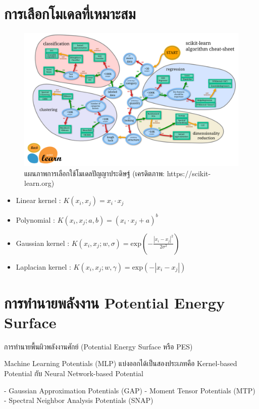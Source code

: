 \section{การเลือกโมเดลที่เหมาะสม}

\begin{figure}[H]
    \centering
    \includegraphics[width=0.9\linewidth]{fig/ml_map.png}
    \caption{แผนภาพการเลือกใช้โมเดลปัญญาประดิษฐ์ (เครดิตภาพ: https://scikit-learn.org)}
    \label{fig:ml_map}
\end{figure}

\begin{itemize}
    \item Linear kernel : $K(x_i, x_j) = x_i \cdot x_j$
    \item Polynomial : $K(x_i, x_j; a, b) = (x_i \cdot x_j + a)^b$
    \item Gaussian kernel : $K(x_i, x_j; w, \sigma) = \mathrm{exp}\left(-\frac{|x_i-x_j|^2}{2\sigma^2}\right)$
    \item Laplacian kernel : $K(x_i, x_j; w, \gamma) = \mathrm{exp}\left(-{|x_i-x_j|}\right)$
\end{itemize}

\section{การทำนายพลังงาน Potential Energy Surface}

การทำนายพื้นผิวพลังงานศักย์ (Potential Energy Surface หรือ PES)

Machine Learning Potentials (MLP) แบ่งออกได้เป็นสองประเภทคือ Kernel-based Potential กับ Neural Network-based Potential

- Gaussian Approximation Potentials (GAP)\cite{bartok2010}
- Moment Tensor Potentials (MTP)\cite{shapeev2016}
- Spectral Neighbor Analysis Potentials (SNAP)\cite{thompson2015}


